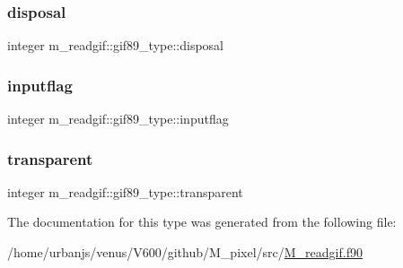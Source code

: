 \subsubsection{\texorpdfstring{disposal}{disposal}}
{\footnotesize\ttfamily integer m\+\_\+readgif\+::gif89\+\_\+type\+::disposal}

\mbox{\label{structm__readgif_1_1gif89__type_aa2e42514cf1c8e2e8b11740ab3a72115}} 
\subsubsection{\texorpdfstring{inputflag}{inputflag}}
{\footnotesize\ttfamily integer m\+\_\+readgif\+::gif89\+\_\+type\+::inputflag}

\mbox{\label{structm__readgif_1_1gif89__type_aa7d3577606d5b12cdaf941f2f467e1b3}} 
\subsubsection{\texorpdfstring{transparent}{transparent}}
{\footnotesize\ttfamily integer m\+\_\+readgif\+::gif89\+\_\+type\+::transparent}



The documentation for this type was generated from the following file\+:\begin{DoxyCompactItemize}
\item 
/home/urbanjs/venus/\+V600/github/\+M\+\_\+pixel/src/\mbox{\hyperlink{M__readgif_8f90}{M\+\_\+readgif.\+f90}}\end{DoxyCompactItemize}
